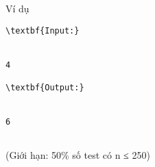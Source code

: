 Ví dụ
\begin{verbatim}
\textbf{Input:}


4

\textbf{Output:}


6


\end{verbatim}

   (Giới hạn: 50\% số test có n ≤ 250)